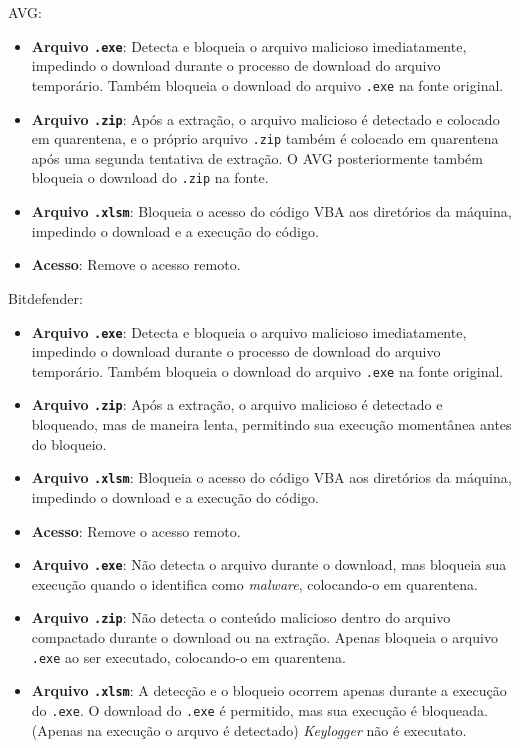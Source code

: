 \documentclass[12pt]{article}
\begin{document}
\noindent AVG:
\begin{itemize}
    \item \textbf{Arquivo \texttt{.exe}}: Detecta e bloqueia o arquivo malicioso imediatamente, impedindo o download durante o processo de download do arquivo temporário. Também bloqueia o download do arquivo \texttt{.exe} na fonte original.
    \item \textbf{Arquivo \texttt{.zip}}: Após a extração, o arquivo malicioso é detectado e colocado em quarentena, e o próprio arquivo \texttt{.zip} também é colocado em quarentena após uma segunda tentativa de extração. O AVG posteriormente também bloqueia o download do \texttt{.zip} na fonte.
    \item \textbf{Arquivo \texttt{.xlsm}}: Bloqueia o acesso do código VBA aos diretórios da máquina, impedindo o download e a execução do código.
    \item \textbf{Acesso}: Remove o acesso remoto.
\end{itemize}

\noindent Bitdefender:
\begin{itemize}
    \item \textbf{Arquivo \texttt{.exe}}: Detecta e bloqueia o arquivo malicioso imediatamente, impedindo o download durante o processo de download do arquivo temporário. Também bloqueia o download do arquivo \texttt{.exe} na fonte original.
    \item \textbf{Arquivo \texttt{.zip}}: Após a extração, o arquivo malicioso é detectado e bloqueado, mas de maneira lenta, permitindo sua execução momentânea antes do bloqueio.
    \item \textbf{Arquivo \texttt{.xlsm}}: Bloqueia o acesso do código VBA aos diretórios da máquina, impedindo o download e a execução do código.
    \item \textbf{Acesso}: Remove o acesso remoto.
\end{itemize}

\begin{itemize}
    \item \textbf{Arquivo \texttt{.exe}}: Não detecta o arquivo durante o download, mas bloqueia sua execução quando o identifica como \textit{malware}, colocando-o em quarentena.
    \item \textbf{Arquivo \texttt{.zip}}: Não detecta o conteúdo malicioso dentro do arquivo compactado durante o download ou na extração. Apenas bloqueia o arquivo \texttt{.exe} ao ser executado, colocando-o em quarentena.
    \item \textbf{Arquivo \texttt{.xlsm}}: A detecção e o bloqueio ocorrem apenas durante a execução do \texttt{.exe}. O download do \texttt{.exe} é permitido, mas sua execução é bloqueada. (Apenas na execução o arquvo é detectado) \textit{Keylogger} não é executato.
\end{itemize}
\end{document}
